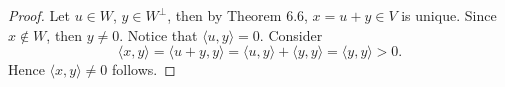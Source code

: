 \begin{Exercise}
	\begin{proof}
		Let $u\in W$, $y\in W^{\perp}$, then by Theorem 6.6, $x = u+y\in V$ is unique. Since $x\notin W$, then $y\neq 0$. Notice that $\langle u,y \rangle = 0$. Consider
		$$
		\langle x,y \rangle
		= \langle u+y, y \rangle
		= \langle u,y \rangle + \langle y,y \rangle
		= \langle y,y \rangle
		> 0.
		$$
		Hence $\langle x,y \rangle \neq 0$ follows.
	\end{proof}
\end{Exercise}